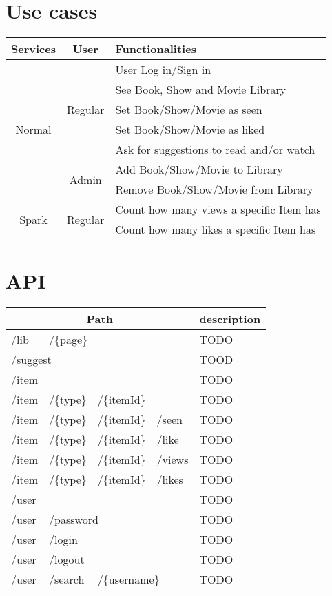 \documentclass{article}
\begin{document}
\section{Use cases}
\label{sec:cases}
\begin{table}[H]
  \centering
  \begin{tabular}{c|c|l} 
    Services & User & Functionalities \\ \hline
    \multirow{7}{*}{ Normal }
      & \multirow{5}{*}{ Regular } 
        & User Log in/Sign in \\
      & & See Book, Show and Movie Library \\
      & & Set Book/Show/Movie as seen \\
      & & Set Book/Show/Movie as liked \\ 
      & & Ask for suggestions to read and/or watch \\ \cline{2-3}
    & \multirow{2}{*}{ Admin } 
        & Add Book/Show/Movie to Library \\
      & & Remove Book/Show/Movie from Library \\ \hline
    \multirow{2}{*}{ Spark }
      & \multirow{2}{*}{ Regular }
        & Count how many views a specific Item has \\
      & & Count how many likes a specific Item has \\
  \end{tabular}
\end{table}

\section{API}
\label{sec:api}
\begin{table}[H]
  \centering
  \begin{tabular}{l l l l l}
    \multicolumn{4}{c}{Path} & description 
    \\ \hline
    /lib & \multicolumn{3}{l}{/\{page\}} &
    TODO
    \\
    \multicolumn{4}{l}{/suggest} &
    TOOD
    \\
    /item & & & &
    TODO
    \\
    /item & /\{type\} & /\{itemId\} & &
    TODO
    \\
    /item & /\{type\} & /\{itemId\} & /seen &
    TODO
    \\
    /item & /\{type\} & /\{itemId\} & /like &
    TODO
    \\
    /item & /\{type\} & /\{itemId\} & /views &
    TODO
    \\
    /item & /\{type\} & /\{itemId\} & /likes &
    TODO
    \\
    \multicolumn{4}{l}{/user} &
    TODO
    \\
    /user & \multicolumn{3}{l}{/password} &
    TODO
    \\
    /user & \multicolumn{3}{l}{/login} &
    TODO
    \\
    /user & \multicolumn{3}{l}{/logout} &
    TODO
    \\
    /user & /search & \multicolumn{2}{l}{/\{username\}} &
    TODO
  \end{tabular}
\end{table}
\end{document}
